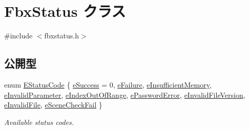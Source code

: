 \hypertarget{class_fbx_status}{}\section{Fbx\+Status クラス}
\label{class_fbx_status}


{\ttfamily \#include $<$fbxstatus.\+h$>$}

\subsection*{公開型}
\begin{DoxyCompactItemize}
\item 
enum \hyperlink{class_fbx_status_a6a631d5d95b28e31a19aabd5f5809ecc}{E\+Status\+Code} \{ \newline
\hyperlink{class_fbx_status_a6a631d5d95b28e31a19aabd5f5809ecca2b9268ddcf14e019fdc7f0ba7d0c8c65}{e\+Success} = 0, 
\hyperlink{class_fbx_status_a6a631d5d95b28e31a19aabd5f5809ecca82a312d3d317510ac68036063f925bc6}{e\+Failure}, 
\hyperlink{class_fbx_status_a6a631d5d95b28e31a19aabd5f5809ecca01fdc2630da56d2572b505ca8c19cb65}{e\+Insufficient\+Memory}, 
\hyperlink{class_fbx_status_a6a631d5d95b28e31a19aabd5f5809ecca11e1b245afeb838408e7a7797a5e09ae}{e\+Invalid\+Parameter}, 
\newline
\hyperlink{class_fbx_status_a6a631d5d95b28e31a19aabd5f5809ecca799b1782f07189a0a2fb51763a57cca6}{e\+Index\+Out\+Of\+Range}, 
\hyperlink{class_fbx_status_a6a631d5d95b28e31a19aabd5f5809eccaac3f30237566cb5a030bc0366afb5131}{e\+Password\+Error}, 
\hyperlink{class_fbx_status_a6a631d5d95b28e31a19aabd5f5809ecca9af08cdb4d0c4db0a7969e5ad4e4ede1}{e\+Invalid\+File\+Version}, 
\hyperlink{class_fbx_status_a6a631d5d95b28e31a19aabd5f5809ecca09c6c98d4cb558de5efc53f60368f082}{e\+Invalid\+File}, 
\newline
\hyperlink{class_fbx_status_a6a631d5d95b28e31a19aabd5f5809eccaefa45d20d51d4d33a02abc2adf646025}{e\+Scene\+Check\+Fail}
 \}\begin{DoxyCompactList}\small\item\em Available status codes. \end{DoxyCompactList}
\end{DoxyCompactItemize}
